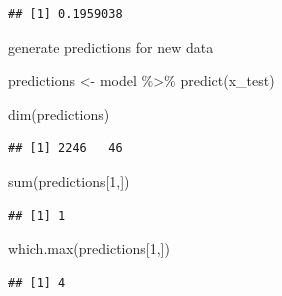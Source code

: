 \documentclass[]{article}
\newenvironment{Shaded}{\begin{snugshade}}{\end{snugshade}}
\newcommand{\DecValTok}[1]{\textcolor[rgb]{0.00,0.00,0.81}{#1}}
\newcommand{\FunctionTok}[1]{\textcolor[rgb]{0.00,0.00,0.00}{#1}}
\newcommand{\NormalTok}[1]{#1}
\newcommand{\OtherTok}[1]{\textcolor[rgb]{0.56,0.35,0.01}{#1}}
\newcommand{\SpecialCharTok}[1]{\textcolor[rgb]{0.00,0.00,0.00}{#1}}
\begin{document}
\begin{verbatim}
## [1] 0.1959038
\end{verbatim}

generate predictions for new data

\begin{Shaded}
\begin{Highlighting}[]
\NormalTok{predictions }\OtherTok{\textless{}{-}}\NormalTok{ model }\SpecialCharTok{\%\textgreater{}\%} \FunctionTok{predict}\NormalTok{(x\_test)}

\FunctionTok{dim}\NormalTok{(predictions)}
\end{Highlighting}
\end{Shaded}

\begin{verbatim}
## [1] 2246   46
\end{verbatim}

\begin{Shaded}
\begin{Highlighting}[]
\FunctionTok{sum}\NormalTok{(predictions[}\DecValTok{1}\NormalTok{,])}
\end{Highlighting}
\end{Shaded}

\begin{verbatim}
## [1] 1
\end{verbatim}

\begin{Shaded}
\begin{Highlighting}[]
\FunctionTok{which.max}\NormalTok{(predictions[}\DecValTok{1}\NormalTok{,])}
\end{Highlighting}
\end{Shaded}

\begin{verbatim}
## [1] 4
\end{verbatim}
\end{document}
